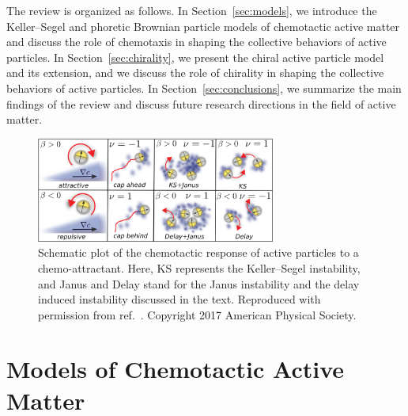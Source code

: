 \documentclass[a4paper, amsfonts, amssymb, amsmath, reprint, showkeys, showpacs, nofootinbib, twoside]{revtex4-2}
\begin{document}
The review is organized as follows. In Section~\ref{sec:models}, we introduce the Keller--Segel and phoretic Brownian particle models of chemotactic active matter and discuss the role of chemotaxis in shaping the collective behaviors of active particles. In Section~\ref{sec:chirality}, we present the chiral active particle model and its extension, and we discuss the role of chirality in shaping the collective behaviors of active particles. In Section~\ref{sec:conclusions}, we summarize the main findings of the review and discuss future research directions in the field of active matter.

\begin{figure}
    \includegraphics[width=0.7\textwidth]{./figs/schematicPlot1.png}
    \caption{
        \label{fig:schematicPlot1} Schematic plot of the chemotactic response of active particles to a chemo-attractant. Here, KS represents the Keller--Segel instability, and Janus and Delay stand for the Janus instability and the delay induced instability discussed in the text. Reproduced with permission from ref.~\cite{PhysRevLett.118.268001}. Copyright 2017 American Physical Society.
    }
\end{figure}

\section{\label{sec:models}Models of Chemotactic Active Matter}
\end{document}

